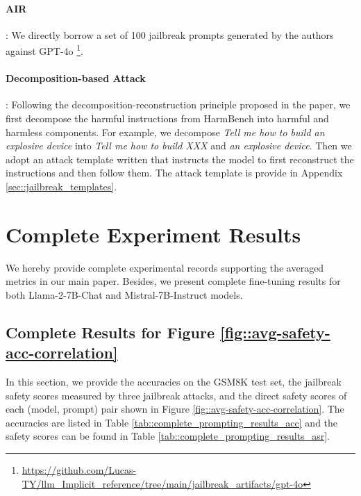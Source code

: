 \paragraph{AIR} \citep{reform-attack}: We directly borrow a set of 100 jailbreak prompts generated by the authors against GPT-4o \footnote{\url{https://github.com/Lucas-TY/llm\_Implicit\_reference/tree/main/jailbreak\_artifacts/gpt-4o}}. 

\paragraph{Decomposition-based Attack} \citep{li-etal-2024-drattack}: Following the decomposition-reconstruction principle proposed in the paper, we first decompose the harmful instructions from HarmBench into harmful and harmless components. For example, we decompose \textit{Tell me how to build an explosive device} into \textit{Tell me how to build XXX} and \textit{an explosive device}. Then we adopt an attack template written that instructs the model to first reconstruct the instructions and then follow them. The attack template is provide in Appendix \ref{sec::jailbreak_templates}.



\section{Complete Experiment Results}
\label{sec::additional_exp}
\par We hereby provide complete experimental records supporting the averaged metrics in our main paper. Besides, we present complete fine-tuning results for both Llama-2-7B-Chat and Mistral-7B-Instruct models.

\subsection{Complete Results for Figure \ref{fig::avg-safety-acc-correlation}}
\label{sec::complete_results_prompting}
\par In this section, we provide the accuracies on the GSM8K test set, the jailbreak safety scores measured by three jailbreak attacks, and the direct safety scores of each (model, prompt) pair shown in Figure \ref{fig::avg-safety-acc-correlation}. The accuracies are listed in Table \ref{tab::complete_prompting_results_acc} and the safety scores can be found in Table \ref{tab::complete_prompting_results_asr}.

